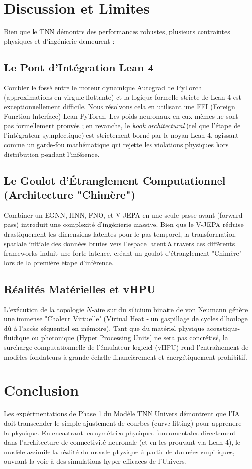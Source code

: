 \documentclass[11pt,a4paper]{article}
\begin{document}
\section{Discussion et Limites}
Bien que le TNN démontre des performances robustes, plusieurs contraintes physiques et d'ingénierie demeurent :

\subsection{Le Pont d'Intégration Lean 4}
Combler le fossé entre le moteur dynamique Autograd de PyTorch (approximations en virgule flottante) et la logique formelle stricte de Lean 4 est exceptionnellement difficile. Nous résolvons cela en utilisant une FFI (Foreign Function Interface) Lean-PyTorch. Les poids neuronaux en eux-mêmes ne sont pas formellement prouvés ; en revanche, le \textit{hook architectural} (tel que l'étape de l'intégrateur symplectique) est strictement borné par le noyau Lean 4, agissant comme un garde-fou mathématique qui rejette les violations physiques hors distribution pendant l'inférence.

\subsection{Le Goulot d'Étranglement Computationnel (Architecture "Chimère")}
Combiner un EGNN, HNN, FNO, et V-JEPA en une seule passe avant (forward pass) introduit une complexité d'ingénierie massive. Bien que le V-JEPA réduise drastiquement les dimensions latentes pour le pas temporel, la transformation spatiale initiale des données brutes vers l'espace latent à travers ces différents frameworks induit une forte latence, créant un goulot d'étranglement "Chimère" lors de la première étape d'inférence.

\subsection{Réalités Matérielles et vHPU}
L'exécution de la topologie $N$-aire sur du silicium binaire de von Neumann génère une immense "Chaleur Virtuelle" (Virtual Heat - un gaspillage de cycles d'horloge dû à l'accès séquentiel en mémoire). Tant que du matériel physique acoustique-fluidique ou photonique (Hyper Processing Units) ne sera pas concrétisé, la surcharge computationnelle de l'émulateur logiciel (vHPU) rend l'entraînement de modèles fondateurs à grande échelle financièrement et énergétiquement prohibitif.

\section{Conclusion}
Les expérimentations de Phase 1 du Modèle TNN Univers démontrent que l'IA doit transcender le simple ajustement de courbes (curve-fitting) pour apprendre la physique. En encastrant les symétries physiques fondamentales directement dans l'architecture de connectivité neuronale (et en les prouvant via Lean 4), le modèle assimile la réalité du monde physique à partir de données empiriques, ouvrant la voie à des simulations hyper-efficaces de l'Univers.
\end{document}
